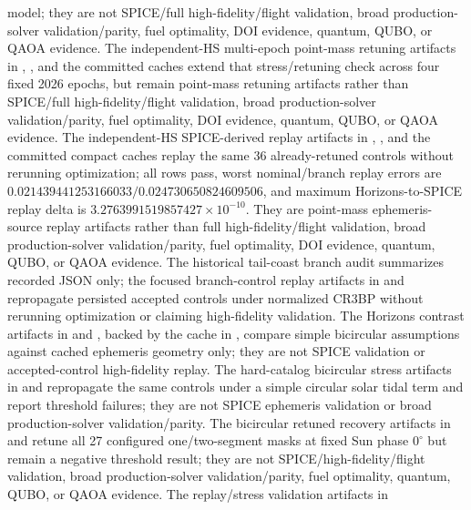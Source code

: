 \documentclass[11pt]{article}
\begin{document}
model; they are not SPICE/full high-fidelity/flight validation, broad production-solver validation/parity, fuel optimality, DOI evidence, quantum, QUBO, or QAOA evidence. The independent-HS multi-epoch point-mass retuning artifacts in , , and the committed  caches extend that stress/retuning check across four fixed 2026 epochs, but remain point-mass retuning artifacts rather than SPICE/full high-fidelity/flight validation, broad production-solver validation/parity, fuel optimality, DOI evidence, quantum, QUBO, or QAOA evidence. The independent-HS SPICE-derived replay artifacts in , , and the committed compact caches  replay the same 36 already-retuned controls without rerunning optimization; all rows pass, worst nominal/branch replay errors are $0.021439441253166033/0.024730650824609506$, and maximum Horizons-to-SPICE replay delta is $3.2763991519857427\times10^{-10}$. They are point-mass ephemeris-source replay artifacts rather than full high-fidelity/flight validation, broad production-solver validation/parity, fuel optimality, DOI evidence, quantum, QUBO, or QAOA evidence. The historical tail-coast branch audit summarizes recorded JSON only; the focused branch-control replay artifacts in  and  repropagate persisted accepted controls under normalized CR3BP without rerunning optimization or claiming high-fidelity validation. The Horizons contrast artifacts in  and , backed by the cache in , compare simple bicircular assumptions against cached ephemeris geometry only; they are not SPICE validation or accepted-control high-fidelity replay. The hard-catalog bicircular stress artifacts in  and  repropagate the same controls under a simple circular solar tidal term and report threshold failures; they are not SPICE ephemeris validation or broad production-solver validation/parity. The bicircular retuned recovery artifacts in  and  retune all 27 configured one/two-segment masks at fixed Sun phase $0^\circ$ but remain a negative threshold result; they are not SPICE/high-fidelity/flight validation, broad production-solver validation/parity, fuel optimality, quantum, QUBO, or QAOA evidence. The replay/stress validation artifacts in 
\end{document}

